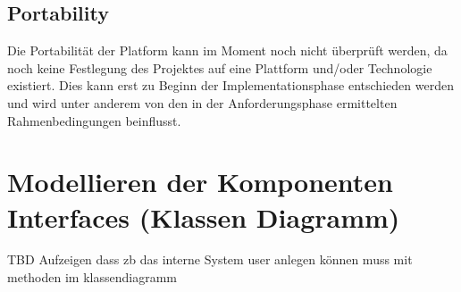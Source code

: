 \subsection{Portability}
Die Portabilität der Platform kann im Moment noch nicht überprüft werden, da noch keine Festlegung des Projektes auf eine Plattform und/oder Technologie existiert. Dies kann erst zu Beginn der Implementationsphase entschieden werden und wird unter anderem von den in der Anforderungsphase ermittelten Rahmenbedingungen beinflusst.


\section{Modellieren der Komponenten Interfaces (Klassen Diagramm)}
TBD
Aufzeigen dass zb das interne System user anlegen können muss mit methoden im klassendiagramm
